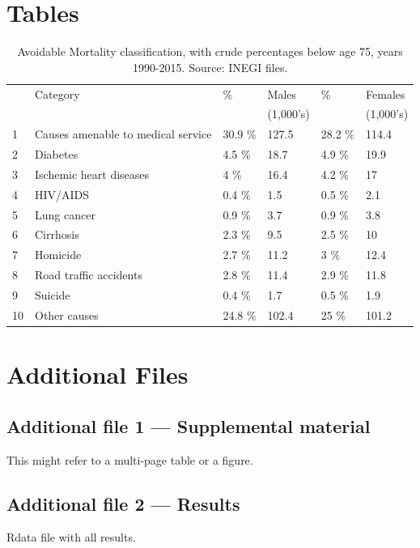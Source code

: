\documentclass{bmcart}
\begin{document}
\begin{backmatter}
\section*{Tables}
\begin{table}[ht]
\centering
\caption{Avoidable Mortality classification, 
             with crude percentages below age 75, years 1990-2015. Source: INEGI files.} 
\label{tab:causes}
\begin{tabular}{llllll}
  \hline
& Category &\% & Males &  \% & Females \\ 
 &&& (1,000's) & & (1,000's)\\ 
  \hline
1&  Causes amenable to medical service & 30.9 \% & 127.5 & 28.2 \% & 114.4 \\ 
2&  Diabetes & 4.5 \% & 18.7 & 4.9 \% & 19.9 \\ 
3&  Ischemic heart diseases & 4 \% & 16.4 & 4.2 \% & 17 \\ 
4&  HIV/AIDS & 0.4 \% & 1.5 & 0.5 \% & 2.1 \\ 
5&  Lung cancer & 0.9 \% & 3.7 & 0.9 \% & 3.8 \\ 
6&  Cirrhosis & 2.3 \% & 9.5 & 2.5 \% & 10 \\ 
7&  Homicide & 2.7 \% & 11.2 & 3 \% & 12.4 \\ 
8&  Road traffic accidents & 2.8 \% & 11.4 & 2.9 \% & 11.8 \\ 
9&  Suicide & 0.4 \% & 1.7 & 0.5 \% & 1.9 \\ 
10&  Other causes & 24.8 \% & 102.4 & 25 \% & 101.2 \\ 
   \hline
\end{tabular}
\end{table}


\section*{Additional Files}
  \subsection*{Additional file 1 --- Supplemental material}
   This might refer to a multi-page table or a figure.

  \subsection*{Additional file 2 --- Results}
 Rdata file with all results.


\end{backmatter}
\end{document}
